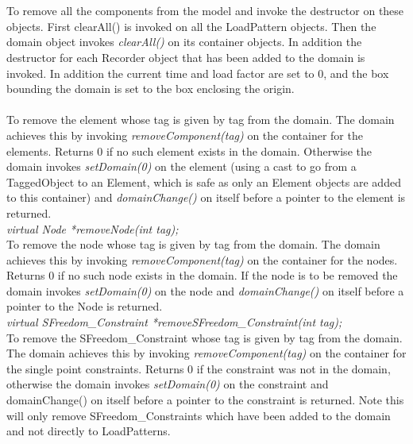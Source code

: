 {  \\
\\
To remove all the components from the model and invoke the destructor
on these objects. First clearAll() is invoked on all the
LoadPattern objects. Then the domain object invokes {\em
clearAll()} on its container objects. In addition the destructor for
each Recorder object that has been added to the domain is invoked. In
addition the current time and load factor are set to $0$, and the box
bounding the domain is set to the box enclosing the origin. \\


\\
To remove the element whose tag is given by \p tag from the
domain. The domain achieves this by invoking {\em
removeComponent(tag)} on the container for the elements. 
Returns $0$ if no such element exists in the domain. Otherwise 
the domain invokes {\em setDomain(0)} on the element (using a cast to
go from a TaggedObject to an Element, which is safe as only an
Element objects are added to this container) and {\em
domainChange()} on itself before a pointer to the element is returned. \\

{\em virtual Node *removeNode(int tag);}\\    
To remove the node whose tag is given by \p tag from the domain. 
The domain achieves this by invoking {\em
removeComponent(tag)} on the container for the nodes. 
Returns $0$ if no such node exists in the domain. If the node is to be
removed the domain invokes {\em setDomain(0)} on the node and {\em
domainChange()} on itself before a pointer to the Node is returned.\\ 

{\em virtual SFreedom\_Constraint *removeSFreedom\_Constraint(int tag);}\\
To remove the SFreedom\_Constraint whose tag is given by \p tag from the
domain. The domain achieves this by invoking {\em
removeComponent(tag)} on the container for the single point
constraints. Returns $0$ if the constraint was not in the domain,
otherwise the domain invokes {\em setDomain(0)} on the constraint and
domainChange() on itself before a pointer to the constraint is
returned. Note this will only remove SFreedom\_Constraints which have been
added to the domain and not directly to LoadPatterns.\\

}
